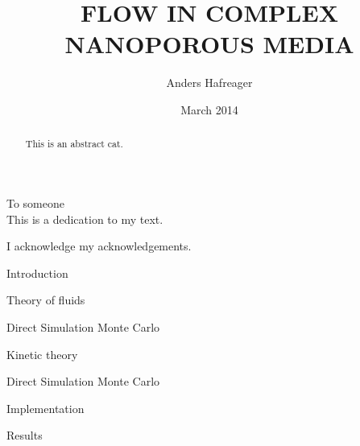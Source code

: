 \documentclass[twoside,english, a4paper, 12pt]{uiofysmaster}
\author{Anders Hafreager}
\title{\uppercase{Flow in complex nanoporous media}}
\date{March 2014}
\begin{document}
\maketitle
\clearpage

\begin{abstract}
This is an abstract cat.
\end{abstract}
\begin{dedication}
To someone
\\\vspace{12pt}
This is a dedication to my text.
\end{dedication}
\begin{acknowledgements}
  I acknowledge my acknowledgements.
\end{acknowledgements}

\tableofcontents
\clearpage
\listoffigures
\clearpage
\listoftables

\begin{chapter}{Introduction}
  
\end{chapter}

\begin{chapter}{Theory of fluids}
  \label{chap:theory_of_fluids}
  
  
  
\end{chapter}

\begin{part}{Direct Simulation Monte Carlo}
\begin{chapter}{Kinetic theory}
  \label{chap:kinetic_theory}
  
  
\end{chapter}

\begin{chapter}{Direct Simulation Monte Carlo}
  \label{chap:dsmc}
  
  
  
  
  
  
  
\end{chapter}
\begin{chapter}{Implementation}
\label{chap:dsmc_implementation}
  
  
  
  
\end{chapter}
\begin{chapter}{Results}
  \label{chap:dsmc_results}
  
  
\end{chapter}
\end{part}
\end{document}
